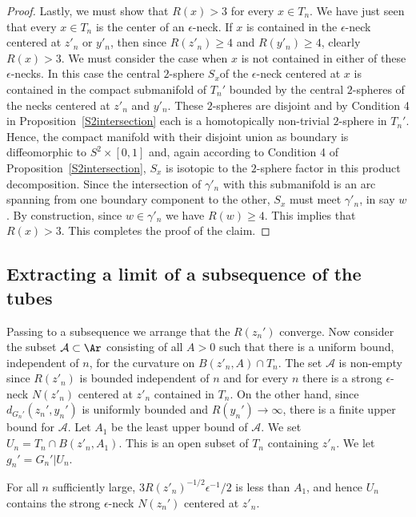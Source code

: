 \begin{proof}
Lastly, we must show that $R(x)>3$ for every $x\in T_n$. We have
just seen that every $x\in T_n$ is the center of an $\epsilon$-neck.
If $x$ is contained in the $\epsilon$-neck centered at $z'_n$ or
$y'_n$, then since $R(z'_n)\ge 4$ and $R(y'_n)\ge 4$, clearly
$R(x)>3$. We must consider the case when $x$ is not contained in
either of these $\epsilon$-necks. In this case the central
$2$-sphere $S_x$of the $\epsilon$-neck centered at $x$ is contained
in the compact submanifold of $T_n'$ bounded by the central
$2$-spheres of the necks centered at $z'_n$ and $y'_n$. These
$2$-spheres are disjoint and by Condition 4 in
Proposition~\ref{S2intersection} each is a homotopically non-trivial
$2$-sphere in $T_n'$. Hence, the compact manifold with their
disjoint union as boundary is diffeomorphic to $S^2\times [0,1]$
and, again according to Condition 4 of
Proposition~\ref{S2intersection}, $S_x$ is isotopic to the
$2$-sphere factor in this product decomposition. Since the
intersection of $\gamma'_n$ with this submanifold is an arc spanning
from one boundary component to the other, $S_x$ must meet
$\gamma'_n$, in say $w$.
 By construction, since $w\in \gamma'_n$ we have $R(w)\ge 4$.
  This implies that $R(x)>3$.
 This completes the proof of the claim.
\end{proof}


\subsection{Extracting a limit of a subsequence of the tubes}

Passing to a subsequence we arrange that the $R(z_n')$ converge. Now
consider the subset ${\mathcal A}\subset \Ar$ consisting of all
$A>0$ such that there is a uniform bound, independent of $n$, for
the curvature on $B(z'_n,A)\cap T_n$. The set ${\mathcal A}$ is
non-empty since $R(z'_n)$ is bounded independent of $n$ and for
every $n$ there is a strong $\epsilon$-neck $N(z'_n)$ centered at
$z'_n$ contained in $T_n$. On the other hand, since
$d_{G_n'}(z_n',y_n')$ is uniformly bounded and $R(y_n')\rightarrow
\infty$,  there is a finite upper bound for ${\mathcal A}$. Let
$A_1$ be the least upper bound of ${\mathcal A}$. We set
$U_n=T_n\cap B(z'_n,A_1)$. This is an open subset of $T_n$
containing $z'_n$. We let $g_n'=G_n'|U_n$.

\begin{claim}
\label{claim:neck-contained-in-Un}
For all $n$ sufficiently large,  $3R(z'_n)^{-1/2}\epsilon^{-1}/2$ is
less than $A_1$, and hence $U_n$ contains the strong $\epsilon$-neck
$N(z_n')$ centered at $z'_n$.
\end{claim}

